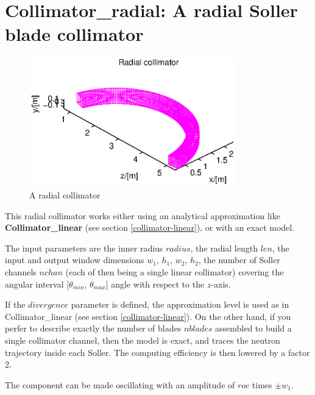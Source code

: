 \section{Collimator\_radial: A radial Soller blade collimator}


\begin{figure}
  \begin{center}
    \includegraphics[width=0.8\textwidth]{figures/radial.eps}
  \end{center}
\caption{A radial collimator}
\label{f:coll-radial}
\end{figure}

This radial collimator works either using an analytical approximation
like {\bf Collimator\_linear} (see section \ref{collimator-linear}),
or with an exact model.

The input parameters are the inner radius $radius$, the radial length $len$,
the input and output window dimensions $w_1$, $h_1$, $w_2$, $h_2$,
the number of Soller channels $nchan$
(each of then being a single linear collimator) covering the angular interval
[$\theta_{min}$, $\theta_{max}$] angle with respect to the $z$-axis.

If the $divergence$ parameter is defined,
the approximation level is used as in {\rm Collimator\_linear}
(see section \ref{collimator-linear}).
On the other hand, if you perfer to describe exactly the number of blades
$nblades$ assembled to build a single collimator channel,
then the model is exact, and traces the neutron trajectory inside each Soller.
The computing efficiency is then lowered by a factor 2.

The component can be made oscillating with an amplitude of $roc$ times
$\pm w_1$.
